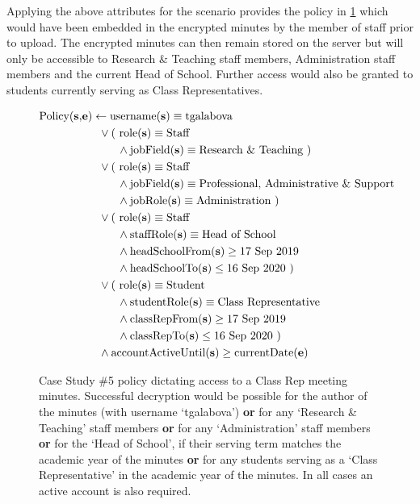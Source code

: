 Applying the above attributes for the scenario provides the policy in \cref{fig:case_study_policy_5} which would have been embedded in the encrypted minutes by the member of staff prior to upload. The encrypted minutes can then remain stored on the server but will only be accessible to Research \& Teaching staff members, Administration staff members and the current Head of School. Further access would also be granted to students currently serving as Class Representatives.

\begin{figure}[ht]
  \centering
\begin{align*}
  \text{Policy(\textbf{s},\textbf{e})}
  &
    \leftarrow
    \text{username(\textbf{s})} \equiv \text{tgalabova}
  \\
  &
    \phantom{::}\vee
    \text{( role(\textbf{s})} \equiv \text{Staff}
  \\
  &
    \phantom{::::::::}\wedge
    \text{jobField(\textbf{s})} \equiv \text{Research \& Teaching )}
  \\
  &
    \phantom{::}\vee
    \text{( role(\textbf{s})} \equiv \text{Staff}
  \\
  &
    \phantom{::::::::}\wedge
    \text{jobField(\textbf{s})} \equiv \text{Professional, Administrative \& Support}
  \\
  &
    \phantom{::::::::}\wedge
    \text{jobRole(\textbf{s})} \equiv \text{Administration )}
  \\
  &
    \phantom{::}\vee
    \text{( role(\textbf{s})} \equiv \text{Staff}
  \\
  &
    \phantom{::::::::}\wedge
    \text{staffRole(\textbf{s})} \equiv \text{Head of School}
  \\
  &
    \phantom{::::::::}\wedge
    \text{headSchoolFrom(\textbf{s})} \geq \text{17 Sep 2019}
  \\
  &
    \phantom{::::::::}\wedge
    \text{headSchoolTo(\textbf{s})} \leq \text{16 Sep 2020 )}
  \\
  &
    \phantom{::}\vee
    \text{( role(\textbf{s})} \equiv \text{Student}
  \\
  &
    \phantom{::::::::}\wedge
    \text{studentRole(\textbf{s})} \equiv \text{Class Representative}
  \\
  &
    \phantom{::::::::}\wedge
    \text{classRepFrom(\textbf{s})} \geq \text{17 Sep 2019}
  \\
  &
    \phantom{::::::::}\wedge
    \text{classRepTo(\textbf{s})} \leq \text{16 Sep 2020 )}
  \\
  &
    \phantom{::}\wedge
    \text{accountActiveUntil(\textbf{s})} \geq \text{currentDate(\textbf{e})}
\end{align*}
  \caption{
    \label{fig:case_study_policy_5}
    Case Study \#5 policy dictating access to a Class Rep meeting minutes.
    Successful decryption would be possible for the author of the minutes (with username `tgalabova') \textbf{or} for any `Research \& Teaching' staff members \textbf{or} for any `Administration' staff members \textbf{or} for the `Head of School', if their serving term matches the academic year of the minutes \textbf{or} for any students serving as a `Class Representative' in the academic year of the minutes. In all cases an active account is also required.
  }
\end{figure}
